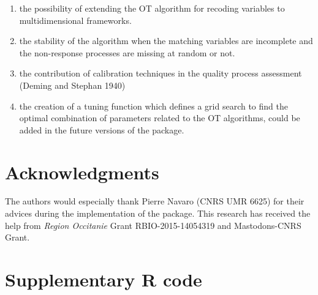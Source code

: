 \begin{enumerate}
\def\labelenumi{\arabic{enumi}.}
\tightlist
\item
  the possibility of extending the OT algorithm for recoding variables to multidimensional frameworks.
\item
  the stability of the algorithm when the matching variables are incomplete and the non-response processes
  are missing at random or not.
\item
  the contribution of calibration techniques in the quality process assessment (Deming and Stephan 1940)
\item
  the creation of a tuning function which defines a grid search to find the optimal combination of parameters
  related to the OT algorithms, could be added in the future versions of the package.
\end{enumerate}

\hypertarget{acknowledgments}{%
\section{Acknowledgments}\label{acknowledgments}}

The authors would especially thank Pierre Navaro (CNRS UMR 6625) for their advices during the implementation of the  package. This research has received the help from \emph{Region Occitanie} Grant RBIO-2015-14054319 and Mastodons-CNRS Grant.

\newpage

\hypertarget{supplementary-r-code}{%
\section{Supplementary R code}\label{supplementary-r-code}}

